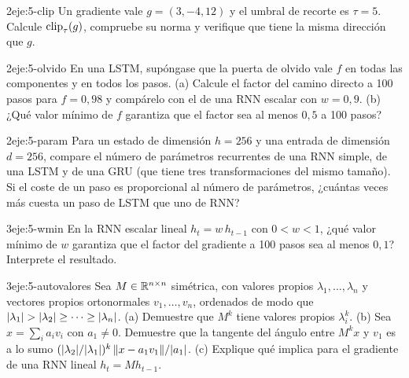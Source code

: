 \begin{ejercicio}{2}{eje:5-clip}
Un gradiente vale $g=(3,-4,12)$ y el umbral de recorte es $\tau=5$. Calcule $\operatorname{clip}_{\tau}(g)$, compruebe su norma y verifique que tiene la misma dirección que $g$.
\end{ejercicio}

\begin{ejercicio}{2}{eje:5-olvido}
En una LSTM, supóngase que la puerta de olvido vale $f$ en todas las componentes y en todos los pasos. (a) Calcule el factor del camino directo a 100 pasos para $f=0{,}98$ y compárelo con el de una RNN escalar con $w=0{,}9$. (b) ¿Qué valor mínimo de $f$ garantiza que el factor sea al menos $0{,}5$ a 100 pasos?
\end{ejercicio}

\begin{ejercicio}{2}{eje:5-param}
Para un estado de dimensión $h=256$ y una entrada de dimensión $d=256$, compare el número de parámetros recurrentes de una RNN simple, de una LSTM y de una GRU (que tiene tres transformaciones del mismo tamaño). Si el coste de un paso es proporcional al número de parámetros, ¿cuántas veces más cuesta un paso de LSTM que uno de RNN?
\end{ejercicio}

\begin{ejercicio}{3}{eje:5-wmin}
En la RNN escalar lineal $h_t=w\,h_{t-1}$ con $0<w<1$, ¿qué valor mínimo de $w$ garantiza que el factor del gradiente a 100 pasos sea al menos $0{,}1$? Interprete el resultado.
\end{ejercicio}

\begin{ejercicio}{3}{eje:5-autovalores}
Sea $M\in\mathbb{R}^{n\times n}$ simétrica, con valores propios $\lambda_1,\dots,\lambda_n$ y vectores propios ortonormales $v_1,\dots,v_n$, ordenados de modo que $\lvert\lambda_1\rvert>\lvert\lambda_2\rvert\ge\dots\ge\lvert\lambda_n\rvert$. (a) Demuestre que $M^{k}$ tiene valores propios $\lambda_i^{k}$. (b) Sea $x=\sum_i a_i v_i$ con $a_1\neq 0$. Demuestre que la tangente del ángulo entre $M^{k}x$ y $v_1$ es a lo sumo $(\lvert\lambda_2\rvert/\lvert\lambda_1\rvert)^{k}\,\lVert x-a_1v_1\rVert/\lvert a_1\rvert$. (c) Explique qué implica para el gradiente de una RNN lineal $h_t=Mh_{t-1}$.
\end{ejercicio}
